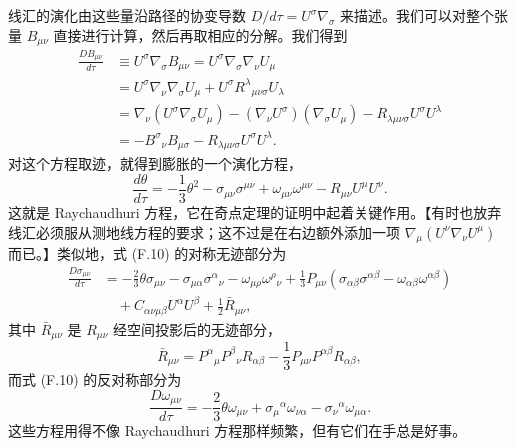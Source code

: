 线汇的演化由这些量沿路径的协变导数 $D/d\tau = U^\sigma\nabla_\sigma$ 来描述。我们可以对整个张量 $B_{\mu\nu}$ 直接进行计算，然后再取相应的分解。我们得到
\begin{align*}
\frac{DB_{\mu\nu}}{d\tau} &\equiv U^\sigma\nabla_\sigma B_{\mu\nu} = U^\sigma\nabla_\sigma\nabla_\nu U_\mu \\
&= U^\sigma\nabla_\nu\nabla_\sigma U_\mu + U^\sigma R^\lambda{}_{\mu\nu\sigma}U_\lambda \\
&= \nabla_\nu(U^\sigma\nabla_\sigma U_\mu) - (\nabla_\nu U^\sigma)(\nabla_\sigma U_\mu) - R_{\lambda\mu\nu\sigma}U^\sigma U^\lambda \\
&= -B^\sigma{}_\nu B_{\mu\sigma} - R_{\lambda\mu\nu\sigma}U^\sigma U^\lambda.
\tag{F.10}
\end{align*}
对这个方程取迹，就得到膨胀的一个演化方程，
\begin{equation*}
\boxed{\frac{d\theta}{d\tau} = -\frac{1}{3}\theta^2 - \sigma_{\mu\nu}\sigma^{\mu\nu} + \omega_{\mu\nu}\omega^{\mu\nu} - R_{\mu\nu}U^\mu U^\nu.}
\tag{F.11}
\end{equation*}
这就是 Raychaudhuri 方程，它在奇点定理的证明中起着关键作用。【有时也放弃线汇必须服从测地线方程的要求；这不过是在右边额外添加一项 $\nabla_\mu(U^\nu\nabla_\nu U^\mu)$ 而已。】类似地，式 (F.10) 的对称无迹部分为
\begin{align*}
\frac{D\sigma_{\mu\nu}}{d\tau} &= -\frac{2}{3}\theta\sigma_{\mu\nu} - \sigma_{\mu\alpha}\sigma^\alpha{}_\nu - \omega_{\mu\rho}\omega^\rho{}_\nu + \frac{1}{3}P_{\mu\nu}\left(\sigma_{\alpha\beta}\sigma^{\alpha\beta} - \omega_{\alpha\beta}\omega^{\alpha\beta}\right) \\
&\quad + C_{\alpha\nu\mu\beta}U^\alpha U^\beta + \frac{1}{2}\bar{R}_{\mu\nu},
\tag{F.12}
\end{align*}
其中 $\bar{R}_{\mu\nu}$ 是 $R_{\mu\nu}$ 经空间投影后的无迹部分，
\begin{equation*}
\bar{R}_{\mu\nu} = P^\alpha{}_\mu P^\beta{}_\nu R_{\alpha\beta} - \frac{1}{3}P_{\mu\nu}P^{\alpha\beta}R_{\alpha\beta},
\tag{F.13}
\end{equation*}
而式 (F.10) 的反对称部分为
\begin{equation*}
\frac{D\omega_{\mu\nu}}{d\tau} = -\frac{2}{3}\theta\omega_{\mu\nu} + \sigma_\mu{}^\alpha\omega_{\nu\alpha} - \sigma_\nu{}^\alpha\omega_{\mu\alpha}.
\tag{F.14}
\end{equation*}
这些方程用得不像 Raychaudhuri 方程那样频繁，但有它们在手总是好事。


